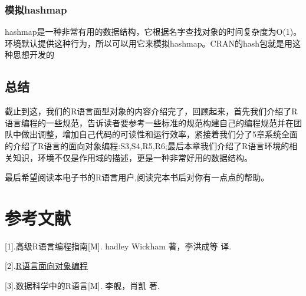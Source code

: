\documentclass[]{book}
\begin{document}
\subsection{模拟hashmap}\label{hashmap}

hashmap是一种非常有用的数据结构，它根据名字查找对象的时间复杂度为O(1)。环境默认提供这种行为，所以可以用它来模拟hashmap。CRAN的hash包就是用这种思想开发的

\section{总结}

截止到这，我们的R语言面型对象的内容介绍完了，回顾起来，首先我们介绍了R语言编程的一些规范，告诉读者要参考一些标准的规范构建自己的编程规范并在团队中做出调整，增加自己代码的可读性和运行效率，紧接着我们分了5章系统全面的介绍了R语言的面向对象编程:S3,S4,R5,R6;最后本章我们介绍了R语言环境的相关知识，环境不仅是作用域的描述，更是一种非常好用的数据结构。

最后希望阅读本电子书的R语言用户,阅读完本书后对你有一点点的帮助。

\chapter{参考文献}\label{Reference}

{[}1{]}.高级R语言编程指南{[}M{]}. hadley Wickham 著，李洪成等 译.

{[}2{]}.\href{https://wenku.baidu.com/view/fc1b919e10a6f524cdbf857d.html}{R语言面向对象编程}

{[}3{]}.数据科学中的R语言{[}M{]}. 李舰，肖凯 著.


\end{document}
